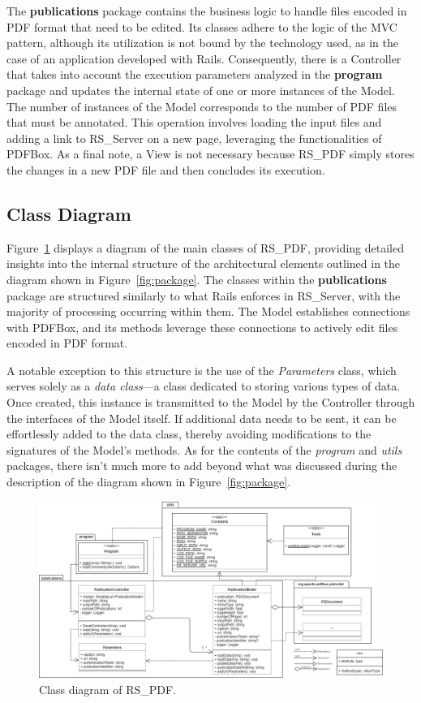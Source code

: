 \documentclass[a4paper, english]{article}
\newcommand{\rsserver}{RS\_Server\xspace}
\newcommand{\rspdf}{RS\_PDF\xspace}
\begin{document}
The \textbf{publications} package contains the business logic to handle files encoded in PDF format that need to be edited. Its classes adhere to the logic of the MVC pattern, although its utilization is not bound by the technology used, as in the case of an application developed with Rails. Consequently, there is a Controller that takes into account the execution parameters analyzed in the \textbf{program} package and updates the internal state of one or more instances of the Model. The number of instances of the Model corresponds to the number of PDF files that must be annotated. This operation involves loading the input files and adding a link to \rsserver on a new page, leveraging the functionalities of PDFBox. As a final note, a View is not necessary because \rspdf simply stores the changes in a new PDF file and then concludes its execution.

\subsection{Class Diagram}

Figure~\ref{fig:classi-2} displays a diagram of the main classes of \rspdf, providing detailed insights into the internal structure of the architectural elements outlined in the diagram shown in Figure~\ref{fig:package}. The classes within the \textbf{publications} package are structured similarly to what Rails enforces in \rsserver, with the majority of processing occurring within them. The Model establishes connections with PDFBox, and its methods leverage these connections to actively edit files encoded in PDF format.

A notable exception to this structure is the use of the \emph{Parameters} class, which serves solely as a \emph{data class}—a class dedicated to storing various types of data. Once created, this instance is transmitted to the Model by the Controller through the interfaces of the Model itself. If additional data needs to be sent, it can be effortlessly added to the data class, thereby avoiding modifications to the signatures of the Model's methods. As for the contents of the \emph{program} and \emph{utils} packages, there isn't much more to add beyond what was discussed during the description of the diagram shown in Figure~\ref{fig:package}.

\begin{figure}[!tbp]
\centering
\includegraphics[scale=0.55, angle=90]{figures/classi-2.png}
\caption{Class diagram of \rspdf.}
\label{fig:classi-2}
\end{figure}
\end{document}
